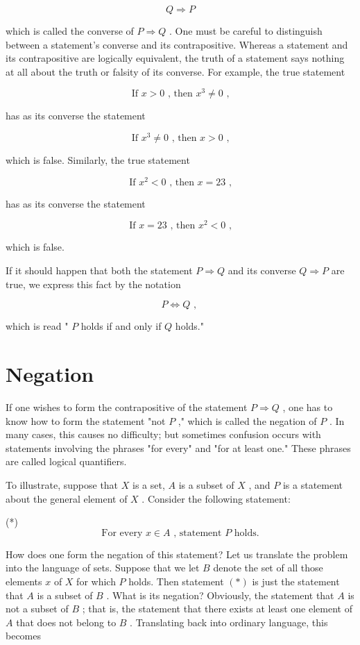 \[
Q \Rightarrow  P
\]

which is called the converse of \(P \Rightarrow  Q\) . One must be careful to distinguish between a statement's converse and its contrapositive. Whereas a statement and its contrapositive are logically equivalent, the truth of a statement says nothing at all about the truth or falsity of its converse. For example, the true statement

\[
\text{ If }x > 0\text{ , then }{x}^{3} \neq  0\text{ , }
\]

has as its converse the statement

\[
\text{ If }{x}^{3} \neq  0\text{ , then }x > 0\text{ , }
\]

which is false. Similarly, the true statement

\[
\text{ If }{x}^{2} < 0\text{ , then }x = {23}\text{ , }
\]

has as its converse the statement

\[
\text{ If }x = {23}\text{ , then }{x}^{2} < 0\text{ , }
\]

which is false.

If it should happen that both the statement \(P \Rightarrow  Q\) and its converse \(Q \Rightarrow  P\) are true, we express this fact by the notation

\[
P \Leftrightarrow  Q\text{ , }
\]

which is read " \(P\) holds if and only if \(Q\) holds."

\section*{Negation}

If one wishes to form the contrapositive of the statement \(P \Rightarrow  Q\) , one has to know how to form the statement "not \(P\) ," which is called the negation of \(P\) . In many cases, this causes no difficulty; but sometimes confusion occurs with statements involving the phrases "for every" and "for at least one." These phrases are called logical quantifiers.

To illustrate, suppose that \(X\) is a set, \(A\) is a subset of \(X\) , and \(P\) is a statement about the general element of \(X\) . Consider the following statement:

(*)
\[
\text{ For every }x \in  A\text{ , statement }P\text{ holds. }
\]

How does one form the negation of this statement? Let us translate the problem into the language of sets. Suppose that we let \(B\) denote the set of all those elements \(x\) of \(X\) for which \(P\) holds. Then statement \(\left( *\right)\) is just the statement that \(A\) is a subset of \(B\) . What is its negation? Obviously, the statement that \(A\) is not a subset of \(B\) ; that is, the statement that there exists at least one element of \(A\) that does not belong to \(B\) . Translating back into ordinary language, this becomes

